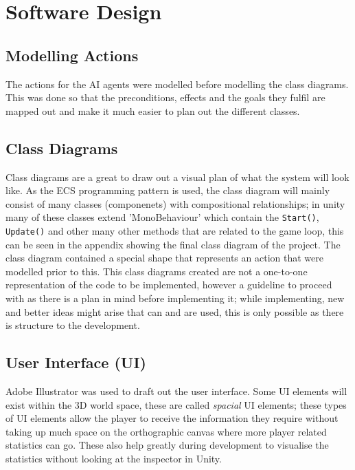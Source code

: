 \documentclass[11pt]{report}
\begin{document}


\section{Software Design}

\subsection{Modelling Actions}
The actions for the AI agents were modelled before modelling the class diagrams. This was done so that the preconditions, effects and the goals they fulfil are mapped out and make it much easier to plan out the different classes.

\subsection{Class Diagrams}
Class diagrams are a great to draw out a visual plan of what the system will look like. As the ECS programming pattern is used, the class diagram will mainly consist of many classes (componenets) with compositional relationships; in unity many of these classes extend 'MonoBehaviour' which contain the \lstinline{Start()}, \lstinline{Update()} and other many other methods that are related to the game loop, this can be seen in the appendix showing the final class diagram of the project. The class diagram contained a special shape that represents an action that were modelled prior to this. 
This class diagrams created are not a one-to-one representation of the code to be implemented, however a guideline to proceed with as there is a plan in mind before implementing it; while implementing, new and better ideas might arise that can and are used, this is only possible as there is structure to the development.

\subsection{User Interface (UI)}
Adobe Illustrator was used to draft out the user interface. Some UI elements will exist within the 3D world space, these are called \textit{spacial} UI elements; these types of UI elements allow the player to receive the information they require without taking up much space on the orthographic canvas where more player related statistics can go\cite{UIChoices}. These also help greatly during development to visualise the statistics without looking at the inspector in Unity.
\end{document}
